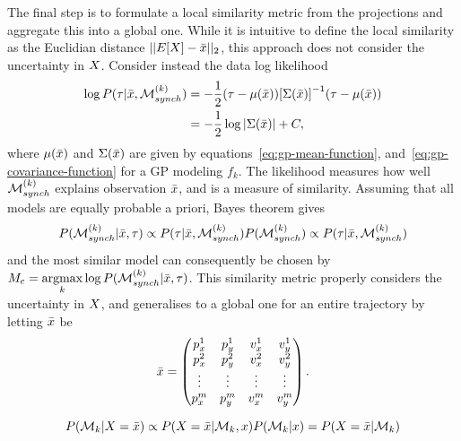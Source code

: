 The final step is to formulate a local similarity metric from the
projections and aggregate this into a global one.
While it is intuitive to define the local similarity as the Euclidian distance $||E[X]
- \bar{x}||_{2}$, this approach does not consider the  uncertainty in $X$. 
Consider instead the data log likelihood
\begin{equation}
  \label{eq:model-log-likelihood}
  \begin{split}
    \log P(\tau \vert \bar{x}, \mathcal{M}_{synch}^{(k)})
    & = -\frac{1}{2}(\tau - \mu(\bar{x})){[\Sigma(\bar{x})]}^{-1}(\tau - \mu(\bar{x})) \\
    & = -\frac{1}{2}\log{|\Sigma(\bar{x})|}+C,
  \end{split}
\end{equation}
where $\mu(\bar{x})$ and $\Sigma(\bar{x})$ are given by
equations~\ref{eq:gp-mean-function},
and~\ref{eq:gp-covariance-function} for a GP modeling $f_{k}$. The
likelihood measures how well $\mathcal{M}_{synch}^{(k)}$ explains observation
$\bar{x}$, and is a measure of similarity. Assuming that all models
are equally probable a priori, Bayes theorem gives
\begin{equation}
  \label{eq:model-posterior}
    P(\mathcal{M}_{synch}^{(k)} \vert \bar{x}, \tau)
     \propto P(\tau \vert \bar{x}, \mathcal{M}_{synch}^{(k)})  
    P(\mathcal{M}_{synch}^{(k)}) 
    \propto P(\tau \vert \bar{x}, \mathcal{M}_{synch}^{(k)})
\end{equation}
and the most similar model can consequently be chosen by $M_{c} = \underset{k}{\mathrm{argmax}} \log
P(\mathcal{M}_{synch}^{(k)} \vert \bar{x}, \tau)$. 
This similarity metric properly considers the uncertainty in
$X$, and generalises to a global one
for an entire trajectory by letting $\bar{x}$ be
\[\bar{x} =
  \begin{pmatrix}
    p_{x}^{1} & p_{y}^{1} & v_{x}^{1} & v_{y}^{1} \\
    p_{x}^{2} & p_{y}^{2} & v_{x}^{2} & v_{y}^{2} \\
    \vdots  & \vdots  & \vdots & \vdots  \\
    p_{x}^{m} & p_{y}^{m} & v_{x}^{m} & v_{y}^{m} \\
  \end{pmatrix}.
\]

\begin{equation}
  P(\mathcal{M}_{k} \vert X = \bar{x})
   \propto P(X = \bar{x} \vert \mathcal{M}_{k}, x) P(\mathcal{M}_{k}
  \vert x) = P(X = \bar{x} \vert \mathcal{M}_{k})
\end{equation}

